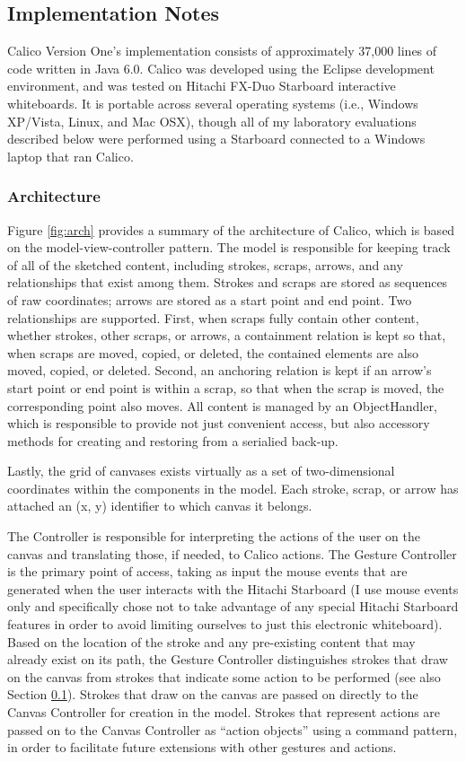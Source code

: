 \subsection {Implementation Notes}
\label{calico:5}

Calico Version One's implementation consists of approximately 37,000 lines of code written in Java 6.0. Calico was developed using the Eclipse development environment, and was tested on Hitachi FX-Duo Starboard interactive whiteboards. It is portable across several operating systems (i.e., Windows XP/Vista, Linux, and Mac OSX), though all of my laboratory evaluations described below were performed using a Starboard connected to a Windows laptop that ran Calico. 

\subsubsection {Architecture}
\label{calico:5.1}

Figure \ref{fig:arch} provides a summary of the architecture of Calico, which is based on the model-view-controller pattern. The model is responsible for keeping track of all of the sketched content, including strokes, scraps, arrows, and any relationships that exist among them. Strokes and scraps are stored as sequences of raw coordinates; arrows are stored as a start point and end point. Two relationships are supported. First, when scraps fully contain other content, whether strokes, other scraps, or arrows, a containment relation is kept so that, when scraps are moved, copied, or deleted, the contained elements are also moved, copied, or deleted. Second, an anchoring relation is kept if an arrow's start point or end point is within a scrap, so that when the scrap is moved, the corresponding point also moves. All content is managed by an ObjectHandler, which is responsible to provide not just convenient access, but also accessory methods for creating and restoring from a serialied back-up. 

Lastly, the grid of canvases exists virtually as a set of two-dimensional coordinates within the components in the model. Each stroke, scrap, or arrow has attached an (x, y) identifier to which canvas it belongs. 

The Controller is responsible for interpreting the actions of the user on the canvas and translating those, if needed, to Calico actions. The Gesture Controller is the primary point of access, taking as input the mouse events that are generated when the user interacts with the Hitachi Starboard (I use mouse events only and specifically chose not to take advantage of any special Hitachi Starboard features in order to avoid limiting ourselves to just this electronic whiteboard). Based on the location of the stroke and any pre-existing content that may already exist on its path, the Gesture Controller distinguishes strokes that draw on the canvas from strokes that indicate some action to be performed (see also Section \ref{calico:5}). Strokes that draw on the canvas are passed on directly to the Canvas Controller for creation in the model. Strokes that represent actions are passed on to the Canvas Controller as ``action objects'' using a command pattern, in order to facilitate future extensions with other gestures and actions.

